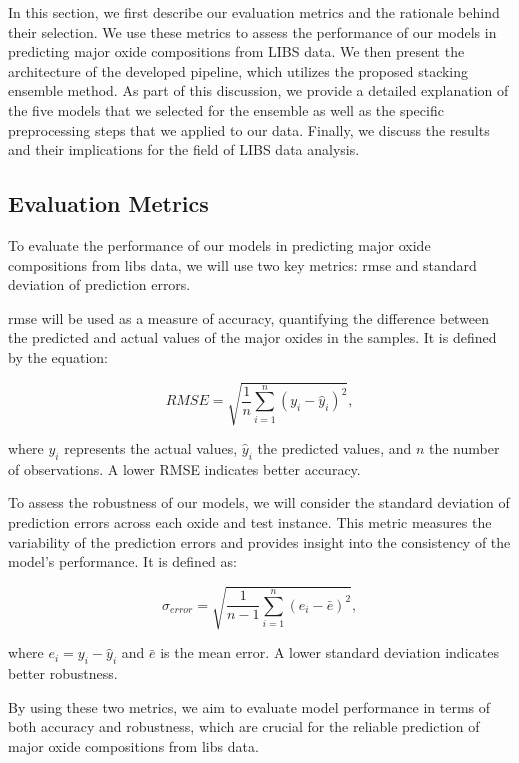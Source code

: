In this section, we first describe our evaluation metrics and the rationale behind their selection.
We use these metrics to assess the performance of our models in predicting major oxide compositions from LIBS data.
We then present the architecture of the developed pipeline, which utilizes the proposed stacking ensemble method.
As part of this discussion, we provide a detailed explanation of the five models that we selected for the ensemble as well as the specific preprocessing steps that we applied to our data.
Finally, we discuss the results and their implications for the field of LIBS data analysis.

\subsection{Evaluation Metrics}
To evaluate the performance of our models in predicting major oxide compositions from \gls{libs} data, we will use two key metrics: \gls{rmse} and standard deviation of prediction errors.

\gls{rmse} will be used as a measure of accuracy, quantifying the difference between the predicted and actual values of the major oxides in the samples. It is defined by the equation:

\begin{equation}
    RMSE = \sqrt{\frac{1}{n} \sum_{i=1}^{n} (y_i - \hat{y}_i)^2},
\end{equation}

where $y_i$ represents the actual values, $\hat{y}_i$ the predicted values, and $n$ the number of observations. A lower RMSE indicates better accuracy.

To assess the robustness of our models, we will consider the standard deviation of prediction errors across each oxide and test instance. This metric measures the variability of the prediction errors and provides insight into the consistency of the model's performance. It is defined as:

\begin{equation}
    \sigma_{error} = \sqrt{\frac{1}{n-1} \sum_{i=1}^{n} (e_i - \bar{e})^2},
\end{equation}

where $e_i = y_i - \hat{y}_i$ and $\bar{e}$ is the mean error. A lower standard deviation indicates better robustness.

By using these two metrics, we aim to evaluate model performance in terms of both accuracy and robustness, which are crucial for the reliable prediction of major oxide compositions from \gls{libs} data.

